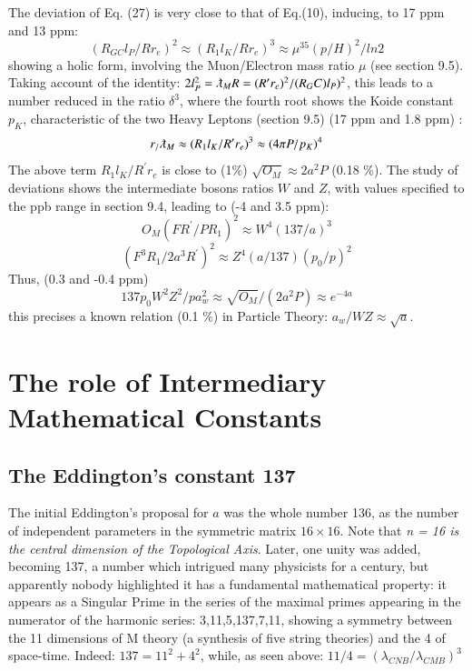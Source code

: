 \documentclass[twoside,draft]{article}
\begin{document}
\begin{sloppypar}
The deviation of Eq. (27) is very close to that of Eq.(10), inducing, to 17 ppm and 13 ppm: 
\begin{equation}
 (R_{GC}l_P/Rr_e)^2 \approx (R_1l_K/Rr_e)^3 \approx \mu^{35}(p/H)^2/ln2
\end{equation}
showing a holic form, involving the Muon/Electron mass ratio $\mu$ (see section 9.5).
Taking account of the identity: $2l_P^2 = \lambdabar_M R = (R^{\prime}r_e)^2/(R_GC)l_P)^2$, this leads to a number reduced in the ratio $\delta^3$, where the fourth root shows the Koide constant $p_K$, characteristic of the two Heavy Leptons (section 9.5) (17 ppm and 1.8 ppm) :
\begin{equation}
r_/\lambdabar_M \approx (R_1l_K/R^{\prime}r_e)^3 \approx (4\pi P/p_K)^4
\end{equation}
The above term $R_1l_K/R^{\prime}r_e$ is close to (1\%) $\sqrt{O_M} \approx 2a^2P$ (0.18 \%). The study of deviations shows the intermediate bosons ratios $W$ and $Z$, with values specified to the ppb range in section 9.4, leading to (-4 and 3.5 ppm):
\begin{equation}
O_M (FR^{\prime}/PR_1)^2 \approx W^4 (137/a)^3
\end{equation}
\begin{equation}
 (F^3R_1 / 2 a^3R^{\prime})^2 \approx Z^4 (a/137)(p_0/p)^2
\end{equation}
Thus, (0.3 and -0.4 ppm)
\begin{equation}
137 p_0 W^2 Z^2/p a_w^2 \approx \sqrt{O_M}/(2a^2 P) \approx e^{-4a}
\end{equation}
this precises a known relation (0.1 \%) in Particle Theory: $a_w/WZ \approx \sqrt{a}$.   

\section{The role of Intermediary Mathematical Constants}

\subsection{The Eddington's constant 137}

The initial Eddington's proposal for $a$ was the whole number 136, as the number of independent parameters in the symmetric matrix $16 \times 16$. Note that \textit{n = 16 is the central dimension of the Topological Axis}. Later, one unity was added, becoming 137, a number which intrigued many physicists for a century, but apparently nobody highlighted it has a fundamental mathematical property: it appears as a Singular Prime in the series of the maximal primes appearing in the numerator of the harmonic
series: 3,11,5,137,7,11, showing a symmetry between the 11 dimensions of M theory (a synthesis of five string theories) and the 4 of space-time. Indeed: $137 = 11^{2} + 4^{2}$, while, as seen above: $11/4 = (\lambda_{CNB}/\lambda_{CMB})^{3}$


\end{sloppypar}
\end{document}
